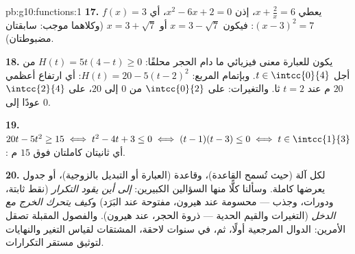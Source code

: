 \begin{solution}{pb:g10:functions:1}
\textbf{17.} $f(x) = 3$ يعطي $x + \frac2x = 6$، إذن
$x^2 - 6x + 2 = 0$، أي $(x - 3)^2 = 7$:
فيكون $x = 3 - \sqrt7$ أو $x = 3 + \sqrt7$ (وكلاهما موجب: سابقتان
مضبوطتان).

\textbf{18.} يكون للعبارة معنى فيزيائي ما دام الحجر محلقًا:
$H(t) = 5t(4 - t) \geq 0$ من أجل $t \in \intcc{0}{4}$. وبإتمام المربع:
$H(t) = 20 - 5(t - 2)^2$: أي ارتفاع أعظمي $20$ م عند $t = 2$ ثا.
والتغيرات:  على $\intcc{0}{2}$ من $0$ إلى $20$،
 على $\intcc{2}{4}$ عودًا إلى $0$.

\textbf{19.} $20t - 5t^2 \geq 15 \iff t^2 - 4t + 3 \leq 0 \iff
(t - 1)(t - 3) \leq 0 \iff t \in \intcc{1}{3}$: أي ثانيتان كاملتان
فوق $15$ م.

\textbf{20.} لكل آلة  (حيث تُسمح
القاعدة)، وقاعدة (العبارة أو التبديل بالزوجية)، 
أو جدول يعرضها كاملة. وسألنا كلًّا منها السؤالين
الكبيرين: \emph{إلى أين يقود التكرار} (نقط
ثابتة، ودورات، وجذب --- محسومة عند هيرون، مفتوحة عند
البَرَد) و\emph{كيف يتحرك الخرج مع الدخل}
(التغيرات والقيم الحدية --- ذروة الحجر،  عند هيرون).
والفصول المقبلة تصقل الأمرين: الدوال المرجعية أولًا،
ثم، في سنوات لاحقة، المشتقات لقياس التغير
والنهايات لتوثيق مستقر التكرارات.
\end{solution}
